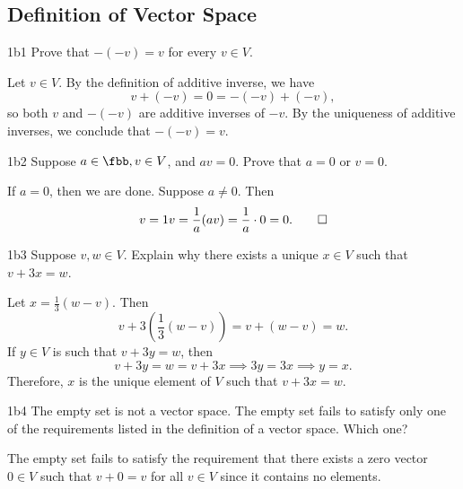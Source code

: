 \subsection{Definition of Vector Space}

\begin{exercise}{1b1}
    Prove that $-(-v) = v$ for every $v \in V$.
\end{exercise}

\begin{sol}
    Let $v \in V$.
	By the definition of additive inverse, we have
    \[
    	v + (-v) = 0 = -(-v) + (-v),
    \]
    so both $v$ and $-(-v)$ are additive inverses of $-v$.
    By the uniqueness of additive inverses, we conclude that $-(-v) = v$.
\end{sol}

\begin{exercise}{1b2}
    Suppose $a \in \fbb, v \in V$, and $av = 0$.
	Prove that $a = 0$ or $v = 0$.
\end{exercise}

\begin{sol}
    If $a = 0$, then we are done.
	Suppose $a \neq 0$.
	Then
    \[
    	v = 1v = \frac1a(av) = \frac1a \cdot 0 = 0. \qedhere
    \]
\end{sol}

\begin{exercise}{1b3}
    Suppose $v, w \in V$.
	Explain why there exists a unique $x \in V$ such that $v + 3x = w$.
\end{exercise}

\begin{sol}
    Let $x = \frac{1}{3}(w - v)$.
    Then
    \[
        v + 3\left(\frac{1}{3}(w - v)\right) = v + (w - v) = w.
    \]
    If $y \in V$ is such that $v + 3y = w$, then
    \[
        v + 3y = w = v + 3x \implies 3y = 3x \implies y = x.
    \]
    Therefore, $x$ is the unique element of $V$ such that $v + 3x = w$.
\end{sol}

\begin{exercise}{1b4}
    The empty set is not a vector space.
	The empty set fails to satisfy only one of the requirements listed in the definition of a vector space.
	Which one?
\end{exercise}

\begin{sol}
    The empty set fails to satisfy the requirement that there exists a zero vector $0 \in V$ such that $v + 0 = v$ for all $v \in V$ since it contains no elements.
\end{sol}


